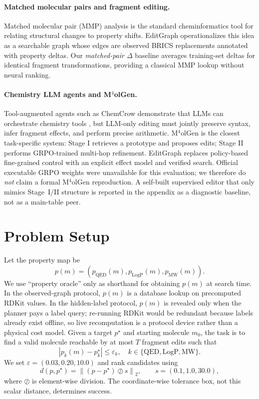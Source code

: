 \documentclass[journal=jcisd8,manuscript=article,email=false]{achemso}
\begin{document}
\paragraph{Matched molecular pairs and fragment editing.}
Matched molecular pair (MMP) analysis is the standard cheminformatics tool for relating structural changes to property shifts. EditGraph operationalizes this idea as a searchable graph whose edges are observed BRICS replacements annotated with property deltas. Our \emph{matched-pair $\Delta$} baseline averages training-set deltas for identical fragment transformations, providing a classical MMP lookup without neural ranking.

\paragraph{Chemistry LLM agents and M$^4$olGen.}
Tool-augmented agents such as ChemCrow demonstrate that LLMs can orchestrate chemistry tools \citep{bran2024chemcrow}, but LLM-only editing must jointly preserve syntax, infer fragment effects, and perform precise arithmetic. M$^4$olGen \citep{li2026m4olgen} is the closest task-specific system: Stage I retrieves a prototype and proposes edits; Stage II performs GRPO-trained multi-hop refinement. EditGraph replaces policy-based fine-grained control with an explicit effect model and verified search. Official executable GRPO weights were unavailable for this evaluation; we therefore do \emph{not} claim a formal M$^4$olGen reproduction. A self-built supervised editor that only mimics Stage~I/II structure is reported in the appendix as a diagnostic baseline, not as a main-table peer.

\section{Problem Setup}
\label{sec:problem}

Let the property map be
\[
p(m)=\left(p_{\mathrm{QED}}(m),p_{\mathrm{LogP}}(m),p_{\mathrm{MW}}(m)\right).
\]
We use ``property oracle'' only as shorthand for obtaining $p(m)$ at search time. In the observed-graph protocol, $p(m)$ is a database lookup on precomputed RDKit values. In the hidden-label protocol, $p(m)$ is revealed only when the planner pays a label query; re-running RDKit would be redundant because labels already exist offline, so live recomputation is a protocol device rather than a physical cost model.
Given a target $p^\star$ and starting molecule $m_0$, the task is to find a valid molecule reachable by at most $T$ fragment edits such that
\[
|p_k(m)-p^\star_k|\leq\varepsilon_k,\quad
k\in\{\mathrm{QED},\mathrm{LogP},\mathrm{MW}\}.
\]
We set $\varepsilon=(0.03,0.20,10.0)$ and rank candidates using
\[
d(p,p^\star)=\left\|(p-p^\star)\oslash s\right\|_2,\qquad
s=(0.1,1.0,30.0),
\]
where $\oslash$ is element-wise division. The coordinate-wise tolerance box, not this scalar distance, determines success.
\end{document}
